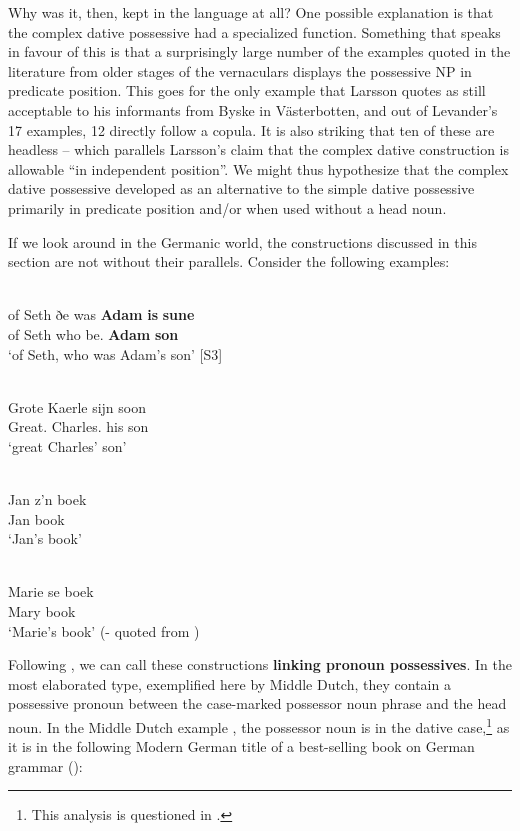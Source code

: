 Why was it, then, kept in the language at all? One possible explanation is that the complex dative possessive had a specialized function. Something that speaks in favour of this is that a surprisingly large number of the examples quoted in the literature from older stages of the vernaculars displays the possessive NP in predicate position. This goes for the only example that Larsson quotes as still acceptable to his informants from Byske in Västerbotten, and out of Levander’s 17 examples, 12 directly follow a copula. It is also striking that ten of these are headless – which parallels Larsson’s claim that the complex dative construction is allowable “in independent position”. We might thus hypothesize that the complex dative possessive developed as an alternative to the simple dative possessive primarily in predicate position and/or when used without a head noun. 

If we look around in the Germanic world, the constructions discussed in this section are not without their parallels. Consider the following examples: 

\ea\label{}
\\
\gll of  Seth  ðe  was  \textbf{Adam} \textbf{is} \textbf{sune}\\
of  Seth  who  be.{\pst}  \textbf{Adam} \textbf{{\poss}} \textbf{son}\\
\glt ‘of Seth, who was Adam’s son’ [S3]
\z

\ea\label{}
\\
\gll Grote  Kaerle  sijn  soon\\
Great.{\dat}  Charles.{\dat}  his  son\\
\glt ‘great Charles’ son’
\z

\ea\label{}
\\
\gll Jan  z’n  boek\\
Jan  {\poss}   book\\
\glt ‘Jan’s book’
\z

\ea\label{}
\\
\gll Marie  se  boek\\
Mary  {\poss}  book\\
\glt ‘Marie’s book’ (- quoted from \citet[56]{Norde1997})
\z

Following \citet{KoptjevskajaTamm2003}, we can call these constructions \textbf{linking pronoun possessives}. In the most elaborated type, exemplified here by Middle Dutch, they contain a possessive pronoun between the case-marked possessor noun phrase and the head noun. In the Middle Dutch example , the possessor noun is in the dative case,\footnote{ This analysis is questioned in \citet{Allen2008}.} as it is in the following Modern German title of a best-selling book on German grammar (\citet{Sick2004}):

